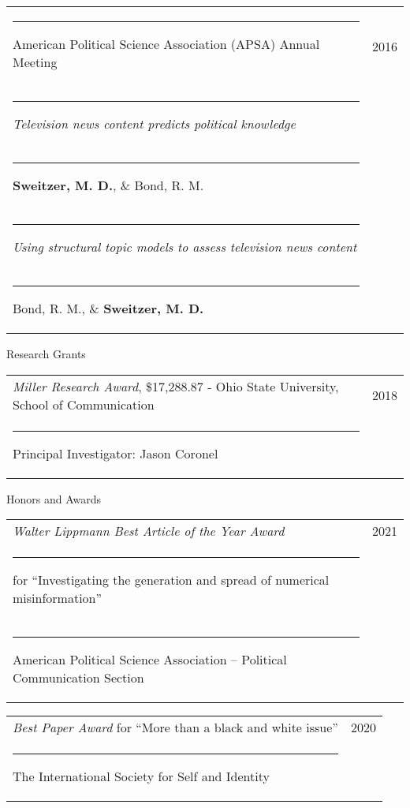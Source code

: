 \documentclass[letterpaper, 10pt]{extarticle}
\begin{document}
\vspace{0.5em}
\begin{tabularx}{\textwidth}{Xr}
\rule{0.5em}{0pt}{\small American Political Science Association (APSA) Annual Meeting} & {\small 2016}\vspace{0.25em}\\
\rule{1em}{0pt}{\raggedright \small \textit{Television news content predicts political knowledge}}\\
\rule{1.25em}{0pt}{\small \textbf{Sweitzer, M. D.}, \& Bond, R. M.}\vspace{0.5em}\\

\rule{1em}{0pt}{\raggedright \small \textit{Using structural topic models to assess television news content}}\\
\rule{1.25em}{0pt}{\small Bond, R. M., \& \textbf{Sweitzer, M. D.}}
\end{tabularx}

\vspace{1em}
{\large Research Grants}

\vspace{1em}
\begin{tabularx}{\textwidth}{Xr}
\textit{Miller Research Award}, \$17,288.87 - Ohio State University, School of Communication & 2018\\
\rule{0.75em}{0pt}Principal Investigator: Jason Coronel
\end{tabularx}

\vspace{1em}
{\large Honors and Awards}

\vspace{1em}
\begin{tabularx}{\textwidth}{Xr}
\textit{Walter Lippmann Best Article of the Year Award} & 2021\\
\rule{0.75em}{0pt}for ``Investigating the generation and spread of numerical misinformation''\\
\rule{0.75em}{0pt}American Political Science Association -- Political Communication Section
\end{tabularx}

\vspace{0.5em}
\begin{tabularx}{\textwidth}{Xr}
\textit{Best Paper Award} for ``More than a black and white issue'' & 2020\\
\rule{0.75em}{0pt}The International Society for Self and Identity
\end{tabularx}
\end{document}
